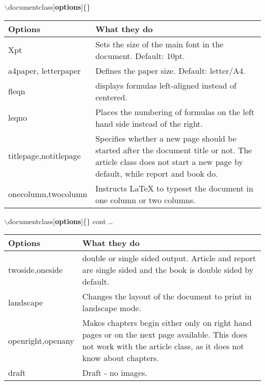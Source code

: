 \documentclass[10pt,times]{beamer}
\begin{document}
\begin{frame}{$\backslash$documentclass$[$\textbf{options}$]$\{\}}
\begin{table}
\begin{tabularx}{0.9\textwidth}{p{} X}
\toprule
Options & What they do \\ \midrule
Xpt & Sets the size of the main font in the document. Default: 10pt. \\
a4paper, \newline letterpaper & Defines the paper size. Default: letter/A4. \\
fleqn & displays formulas left-aligned instead of centered. \\
leqno & Places the numbering of formulas on the left hand side instead of the right. \\
titlepage,\newline  notitlepage & Specifies whether a new page should be started after 
the document title or not. The article class does not start a new page by default, while 
report and book do.\\
onecolumn,\newline  twocolumn & Instructs LaTeX to typeset the document in one column or 
two columns. \\
\end{tabularx}
\end{table}
\end{frame}



\begin{frame}{$\backslash$documentclass$[$\textbf{options}$]$\{\} cont \dots}
\begin{table}
\begin{tabularx}{0.9\textwidth}{p{} X}
\toprule
Options & What they do \\ \midrule
twoside,\newline  oneside & double or single sided output. Article and report are single 
sided and the book is double sided by default. \\
landscape & Changes the layout of the document to print in landscape mode. \\
openright,\newline  openany & Makes chapters begin either only on right hand pages or on 
the next page available. This does not work with the article class, as it does not know 
about chapters. \\
draft & Draft - no images. \\ \bottomrule
\end{tabularx}
\end{table}
\end{frame}
\end{document}
